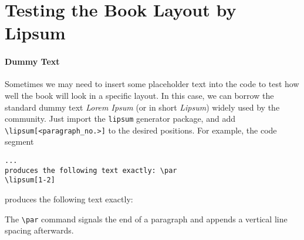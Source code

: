 \section{Testing the Book Layout by Lipsum}

\paragraph{Dummy Text} Sometimes we may need to insert some placeholder text into the code to test how well the book will look in a specific layout. In this case, we can borrow the standard dummy text \textit{Lorem Ipsum} (or in short \textit{Lipsum}) widely used by the community. Just import the \verb|lipsum| generator package, and add \texttt{\textbackslash lipsum[<paragraph\_no.>]} to the desired positions. For example, the code segment
\begin{lstlisting}
...
produces the following text exactly: \par
\lipsum[1-2]
\end{lstlisting}
produces the following text exactly: \par
\lipsum[1-2] \par
The \texttt{\textbackslash par} command signals the end of a paragraph and appends a vertical line spacing afterwards. 